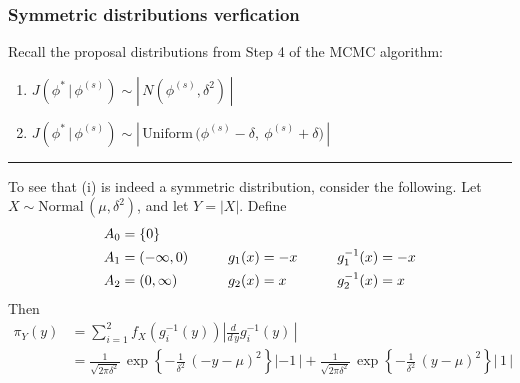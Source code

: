 \documentclass[11pt]{article}
\newcommand{\barS}{\,|\,}
\begin{document}

\subsubsection{Symmetric distributions verfication}

Recall the proposal distributions from Step 4 of the MCMC algorithm:
\begin{enumerate}[label=(\roman*), itemsep=3mm]
\item $ J\left( \phi^* \barS \phi^{(s)} \right) \sim \left|\, N\left( \phi^{(s)}, \delta^2 \right) \,\right| $
\item $ J\left( \phi^* \barS \phi^{(s)} \right) \sim \left|\, \text{Uniform}\, \big( \phi^{(s)} - \delta,~ \phi^{(s)} + \delta \big) \,\right| $
\end{enumerate}

\vspace{0mm} \begin{center} \rule{1.0\textwidth}{0.25mm} \end{center} \vspace{4mm}





\noindent To see that (i) is indeed a symmetric distribution, consider the following.  Let $X \sim \text{Normal}\, (\mu,\delta^2)$, and let $Y = |X|$.  Define
\[ \arraycolsep=5mm \begin{array}{lll}
A_0 = \{0\}       & & \\[1ex]
A_1 = (-\infty,0) & g_1(x) = -x & g_1^{-1}(x) = -x \\[1ex]
A_2 = (0, \infty) &  g_2(x) =x & g_2^{-1}(x) = x
\end{array} \]
Then
\begin{align*}
\pi_Y(y) &= \sum_{i=1}^2 f_X\left( g_i^{-1}(y) \right) \left| \frac{ d }{ d\,y } g_i^{-1}(y) \,\right| \\[1ex]
&= \frac{ 1 }{ \sqrt{ 2\pi\delta^2 } }\, \exp\left\{ - \frac{ 1 }{ \delta^2 }\, (-y - \mu)^2 \right\} | -1 \,| + \frac{ 1 }{ \sqrt{ 2\pi\delta^2 } }\, \exp\left\{ - \frac{ 1 }{ \delta^2 }\, (y - \mu)^2 \right\} |\, 1 \,|
\end{align*} \vspace{4mm}
\end{document}
